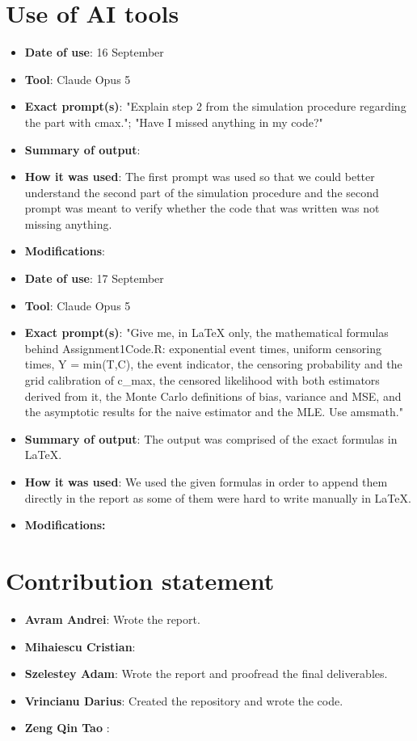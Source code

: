 \documentclass[11pt,a4paper]{article}
\begin{document}
\section*{Use of AI tools}
\begin{itemize}
  \item \textbf{Date of use}: 16 September
  \item \textbf{Tool}: Claude Opus 5 
  \item \textbf{Exact prompt(s)}: "Explain step 2 from the simulation procedure regarding the part with cmax."; "Have I missed anything in my code?"
  \item \textbf{Summary of output}: 
  \item \textbf{How it was used}: The first prompt was used so that we could better understand the second part of the simulation procedure and the second prompt was meant to verify whether the code that was written was not missing anything.
  \item \textbf{Modifications}:
\\
   \item \textbf{Date of use}: 17 September 
  \item \textbf{Tool}: Claude Opus 5 
  \item \textbf{Exact prompt(s)}: "Give me, in LaTeX only, the mathematical formulas behind Assignment1Code.R: exponential event times, uniform censoring times, Y = min(T,C), the event indicator, the censoring probability and the grid calibration of c\_max, the censored likelihood with both estimators derived from it, the Monte Carlo definitions of bias, variance and MSE, and the asymptotic results for the naive estimator and the MLE. Use amsmath." 
  \item \textbf{Summary of output}: The output was comprised of the exact formulas in LaTeX. 
  \item \textbf{How it was used}: We used the given formulas in order to append them directly in the report as some of them were hard to write manually in LaTeX.
  \item \textbf{Modifications:} 
\end{itemize}

\section*{Contribution statement}
\begin{itemize}
  \item \textbf{Avram Andrei}: Wrote the report.
  \item \textbf{Mihaiescu Cristian}: 
  \item \textbf{Szelestey Adam}: Wrote the report and proofread the final deliverables.
  \item \textbf{Vrincianu Darius}: Created the repository and wrote the code.
  \item \textbf{Zeng Qin Tao} :
\end{itemize}
\end{document}
